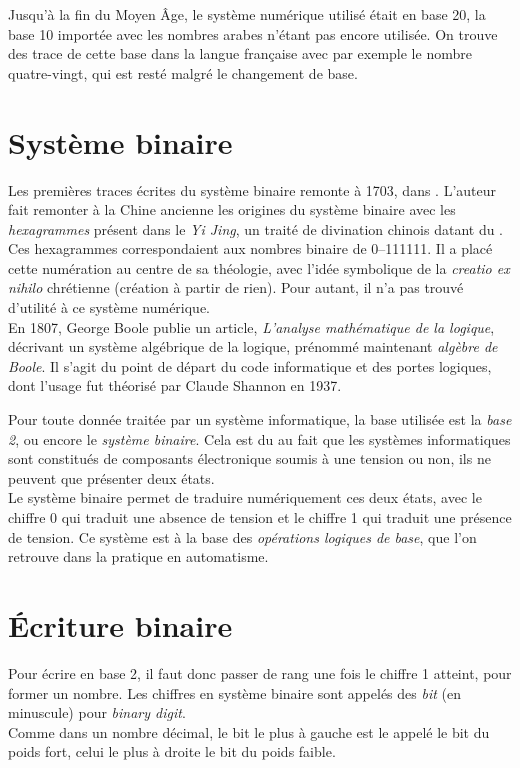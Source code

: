 \documentclass[a4paper, 11pt, twoside, fleqn]{memoir}
\begin{document}
Jusqu'à la fin du Moyen Âge, le système numérique utilisé était en base 20, la base 10 importée avec les nombres arabes n'étant pas encore utilisée. On trouve des trace de cette base dans la langue française avec par exemple le nombre quatre-vingt, qui est resté malgré le changement de base.

\section{Système binaire}

Les premières traces écrites du système binaire remonte à 1703, dans . L'auteur fait remonter à la Chine ancienne les origines du système binaire avec les \emph{hexagrammes} présent dans le \emph{Yi Jing}, un traité de divination chinois datant du  \avjc{}. Ces hexagrammes correspondaient aux nombres binaire de \numrange{0}{111111}.
Il a placé cette numération au centre de sa théologie, avec l'idée symbolique de la \emph{creatio ex nihilo} chrétienne (création à partir de rien). Pour autant, il n'a pas trouvé d'utilité à ce système numérique.\\

En 1807, George Boole publie un article, \emph{L'analyse mathématique de la logique}, décrivant un système algébrique de la logique, prénommé maintenant \emph{algèbre de Boole}. Il s'agit du point de départ du code informatique et des portes logiques, dont l'usage fut théorisé par Claude Shannon en 1937.

Pour toute donnée traitée par un système informatique, la base utilisée est la \emph{base 2}, ou encore le \emph{système binaire}. Cela est du au fait que les systèmes informatiques sont constitués de composants électronique soumis à une tension ou non, ils ne peuvent que présenter deux états.\\
Le système binaire permet de traduire numériquement ces deux états, avec le chiffre 0 qui traduit une absence de tension et le chiffre 1 qui traduit une présence de tension. Ce système est à la base des \emph{opérations logiques de base}, que l'on retrouve dans la pratique en automatisme.\\

	
\section{\'Ecriture binaire}

Pour écrire en base 2, il faut donc passer de rang une fois le chiffre 1 atteint, pour former un nombre. Les chiffres en système binaire sont appelés des \emph{bit} (en minuscule) pour \emph{binary digit}.\\
Comme dans un nombre décimal, le bit le plus à gauche est le appelé le bit du poids fort, celui le plus à droite le bit du poids faible.
\\
\end{document}
